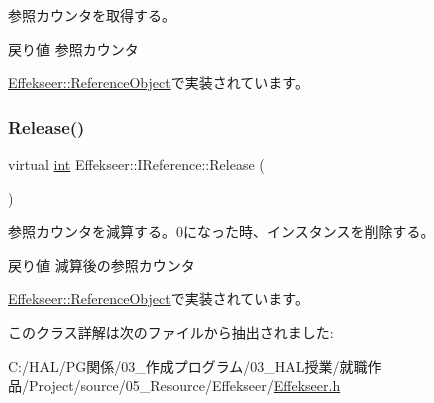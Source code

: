 参照カウンタを取得する。 

\begin{DoxyReturn}{戻り値}
参照カウンタ 
\end{DoxyReturn}


\mbox{\hyperlink{class_effekseer_1_1_reference_object_a4b8c3d79c58ca527850733691053cf5a}{Effekseer\+::\+Reference\+Object}}で実装されています。

\mbox{\label{class_effekseer_1_1_i_reference_ad8d601188c0f088f4748aa2da8758bb5}} 
\subsubsection{\texorpdfstring{Release()}{Release()}}
{\footnotesize\ttfamily virtual \mbox{\hyperlink{namespace_effekseer_ace0abf7c2e6947e519ebe8b54cbcc30a}{int}} Effekseer\+::\+I\+Reference\+::\+Release (\begin{DoxyParamCaption}{ }\end{DoxyParamCaption})\hspace{0.3cm}{\ttfamily [pure virtual]}}



参照カウンタを減算する。0になった時、インスタンスを削除する。 

\begin{DoxyReturn}{戻り値}
減算後の参照カウンタ 
\end{DoxyReturn}


\mbox{\hyperlink{class_effekseer_1_1_reference_object_a6b0e9aa4d994b557d499b15359b580d8}{Effekseer\+::\+Reference\+Object}}で実装されています。



このクラス詳解は次のファイルから抽出されました\+:\begin{DoxyCompactItemize}
\item 
C\+:/\+H\+A\+L/\+P\+G関係/03\+\_\+作成プログラム/03\+\_\+\+H\+A\+L授業/就職作品/\+Project/source/05\+\_\+\+Resource/\+Effekseer/\mbox{\hyperlink{_effekseer_8h}{Effekseer.\+h}}\end{DoxyCompactItemize}
